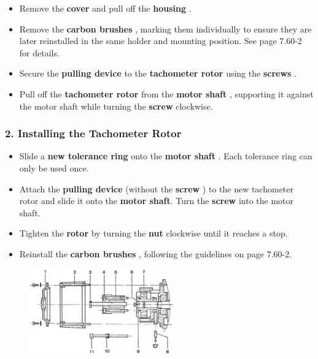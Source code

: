 \begin{itemize}[itemsep=1pt,parsep=0pt]
    \item Remove the \textbf{cover } and pull off the \textbf{housing }.
    \item Remove the \textbf{carbon brushes }, marking them individually  
          to ensure they are later reinstalled in the same holder and mounting position.  
          See page 7.60-2 for details.
    \item Secure the \textbf{pulling device } to the \textbf{tachometer rotor } using the \textbf{screws }.\footnotemark[1]
    \item Pull off the \textbf{tachometer rotor } from the \textbf{motor shaft },  
          supporting it against the motor shaft while turning the \textbf{screw } clockwise.
\end{itemize}

\subsubsection*{2. Installing the Tachometer Rotor}

\begin{itemize}[itemsep=1pt,parsep=0pt]
    \item Slide a \textbf{new tolerance ring } onto the \textbf{motor shaft }.  
          Each tolerance ring can only be used once.
    \item Attach the \textbf{pulling device } (without the \textbf{screw })  
          to the new tachometer rotor and slide it onto the \textbf{motor shaft}.  
          Turn the \textbf{screw } into the motor shaft.
    \item Tighten the \textbf{rotor} by turning the \textbf{nut } clockwise until it reaches a stop.
    \item Reinstall the \textbf{carbon brushes }, following the guidelines on page 7.60-2.
\end{itemize}

\begin{figure}[H]
    \centering
    \includegraphics[width=0.55\textwidth]{images/chapter7/tachometer_rotor_replacement.jpg}
    \label{fig:tachometer_rotor_replacement}
\end{figure}

